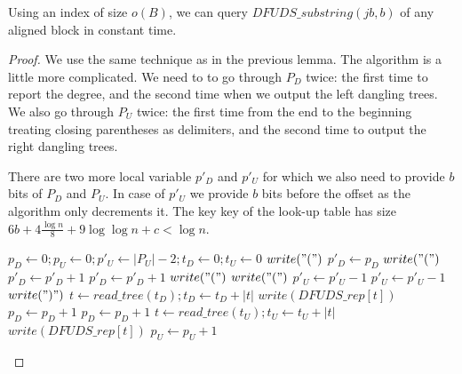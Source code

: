 \begin{lemma}
	Using an index of size $o(B)$, we can query $DFUDS\_substring(j b, b)$ of any aligned block in constant time.
\end{lemma}
\begin{proof}
	We use the same technique as in the previous lemma.
	The algorithm is a little more complicated.
	We need to to go through $P_D$ twice: the first time to report the degree, and the second time when we output the left dangling trees.
	We also go through $P_U$ twice: the first time from the end to the beginning treating closing parentheses as delimiters, and the second time to output the right dangling trees.
	
	There are two more local variable $p'_D$ and $p'_U$ for which we also need to provide $b$ bits of $P_D$ and $P_U$.
	In case of $p'_U$ we provide $b$ bits before the offset as the algorithm only decrements it.
	The key key of the look-up table has size $6b + 4 \frac{\log n}{8} + 9 \log \log n + c < \log n$.
	
	\begin{algorithmic}
		\State $p_D \gets 0; p_U \gets 0; p'_U \gets |P_U| - 2; t_D \gets 0; t_U \gets 0$
		\State $write("(")$ 
			\State $p'_D \gets p_D$ 
			 
				\State $write("(")$
				\State $p'_D \gets p'_D + 1$
			\EndWhile
			\State $p'_D \gets p'_D + 1$ 
			 
				\State $write("(")$
			\EndIf
			 
				\State $write("(")$
				\State $p'_U \gets p'_U - 1$
			\EndWhile
			\State $p'_U \gets p'_U - 1$ 
			\State $write(")")$ 
			 
				\State $t \gets read\_tree(t_D); t_D \gets t_D + |t|$
				\State $write(DFUDS\_rep[t])$
				\State $p_D \gets p_D + 1$
			\EndWhile
			\State $p_D \gets p_D + 1$ 
		\EndWhile
		 
				\State $t \gets read\_tree(t_U); t_U \gets t_U + |t|$
				\State $write(DFUDS\_rep[t])$
			\EndIf
			\State $p_U \gets p_U + 1$ 
		\EndWhile
	\EndFunction
	\end{algorithmic}
\end{proof}

